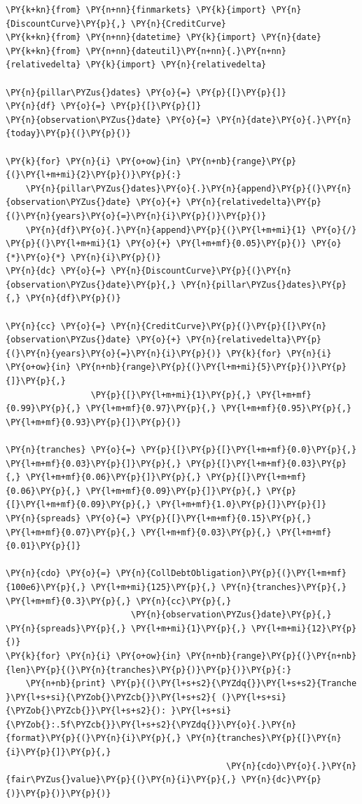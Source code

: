 \begin{codebox}
\begin{Verbatim}[commandchars=\\\{\}]
\PY{k+kn}{from} \PY{n+nn}{finmarkets} \PY{k}{import} \PY{n}{DiscountCurve}\PY{p}{,} \PY{n}{CreditCurve}
\PY{k+kn}{from} \PY{n+nn}{datetime} \PY{k}{import} \PY{n}{date}
\PY{k+kn}{from} \PY{n+nn}{dateutil}\PY{n+nn}{.}\PY{n+nn}{relativedelta} \PY{k}{import} \PY{n}{relativedelta}

\PY{n}{pillar\PYZus{}dates} \PY{o}{=} \PY{p}{[}\PY{p}{]}
\PY{n}{df} \PY{o}{=} \PY{p}{[}\PY{p}{]}
\PY{n}{observation\PYZus{}date} \PY{o}{=} \PY{n}{date}\PY{o}{.}\PY{n}{today}\PY{p}{(}\PY{p}{)}
		
\PY{k}{for} \PY{n}{i} \PY{o+ow}{in} \PY{n+nb}{range}\PY{p}{(}\PY{l+m+mi}{2}\PY{p}{)}\PY{p}{:}
    \PY{n}{pillar\PYZus{}dates}\PY{o}{.}\PY{n}{append}\PY{p}{(}\PY{n}{observation\PYZus{}date} \PY{o}{+} \PY{n}{relativedelta}\PY{p}{(}\PY{n}{years}\PY{o}{=}\PY{n}{i}\PY{p}{)}\PY{p}{)}
    \PY{n}{df}\PY{o}{.}\PY{n}{append}\PY{p}{(}\PY{l+m+mi}{1} \PY{o}{/} \PY{p}{(}\PY{l+m+mi}{1} \PY{o}{+} \PY{l+m+mf}{0.05}\PY{p}{)} \PY{o}{*}\PY{o}{*} \PY{n}{i}\PY{p}{)}
\PY{n}{dc} \PY{o}{=} \PY{n}{DiscountCurve}\PY{p}{(}\PY{n}{observation\PYZus{}date}\PY{p}{,} \PY{n}{pillar\PYZus{}dates}\PY{p}{,} \PY{n}{df}\PY{p}{)}
		
\PY{n}{cc} \PY{o}{=} \PY{n}{CreditCurve}\PY{p}{(}\PY{p}{[}\PY{n}{observation\PYZus{}date} \PY{o}{+} \PY{n}{relativedelta}\PY{p}{(}\PY{n}{years}\PY{o}{=}\PY{n}{i}\PY{p}{)} \PY{k}{for} \PY{n}{i} \PY{o+ow}{in} \PY{n+nb}{range}\PY{p}{(}\PY{l+m+mi}{5}\PY{p}{)}\PY{p}{]}\PY{p}{,}
                 \PY{p}{[}\PY{l+m+mi}{1}\PY{p}{,} \PY{l+m+mf}{0.99}\PY{p}{,} \PY{l+m+mf}{0.97}\PY{p}{,} \PY{l+m+mf}{0.95}\PY{p}{,} \PY{l+m+mf}{0.93}\PY{p}{]}\PY{p}{)}
		
\PY{n}{tranches} \PY{o}{=} \PY{p}{[}\PY{p}{[}\PY{l+m+mf}{0.0}\PY{p}{,} \PY{l+m+mf}{0.03}\PY{p}{]}\PY{p}{,} \PY{p}{[}\PY{l+m+mf}{0.03}\PY{p}{,} \PY{l+m+mf}{0.06}\PY{p}{]}\PY{p}{,} \PY{p}{[}\PY{l+m+mf}{0.06}\PY{p}{,} \PY{l+m+mf}{0.09}\PY{p}{]}\PY{p}{,} \PY{p}{[}\PY{l+m+mf}{0.09}\PY{p}{,} \PY{l+m+mf}{1.0}\PY{p}{]}\PY{p}{]}
\PY{n}{spreads} \PY{o}{=} \PY{p}{[}\PY{l+m+mf}{0.15}\PY{p}{,} \PY{l+m+mf}{0.07}\PY{p}{,} \PY{l+m+mf}{0.03}\PY{p}{,} \PY{l+m+mf}{0.01}\PY{p}{]}
		
\PY{n}{cdo} \PY{o}{=} \PY{n}{CollDebtObligation}\PY{p}{(}\PY{l+m+mf}{100e6}\PY{p}{,} \PY{l+m+mi}{125}\PY{p}{,} \PY{n}{tranches}\PY{p}{,} \PY{l+m+mf}{0.3}\PY{p}{,} \PY{n}{cc}\PY{p}{,}
                         \PY{n}{observation\PYZus{}date}\PY{p}{,} \PY{n}{spreads}\PY{p}{,} \PY{l+m+mi}{1}\PY{p}{,} \PY{l+m+mi}{12}\PY{p}{)}
\PY{k}{for} \PY{n}{i} \PY{o+ow}{in} \PY{n+nb}{range}\PY{p}{(}\PY{n+nb}{len}\PY{p}{(}\PY{n}{tranches}\PY{p}{)}\PY{p}{)}\PY{p}{:}
    \PY{n+nb}{print} \PY{p}{(}\PY{l+s+s2}{\PYZdq{}}\PY{l+s+s2}{Tranche }\PY{l+s+si}{\PYZob{}\PYZcb{}}\PY{l+s+s2}{ (}\PY{l+s+si}{\PYZob{}\PYZcb{}}\PY{l+s+s2}{): }\PY{l+s+si}{\PYZob{}:.5f\PYZcb{}}\PY{l+s+s2}{\PYZdq{}}\PY{o}{.}\PY{n}{format}\PY{p}{(}\PY{n}{i}\PY{p}{,} \PY{n}{tranches}\PY{p}{[}\PY{n}{i}\PY{p}{]}\PY{p}{,} 
                                            \PY{n}{cdo}\PY{o}{.}\PY{n}{fair\PYZus{}value}\PY{p}{(}\PY{n}{i}\PY{p}{,} \PY{n}{dc}\PY{p}{)}\PY{p}{)}\PY{p}{)}


\end{Verbatim}
\end{codebox}
